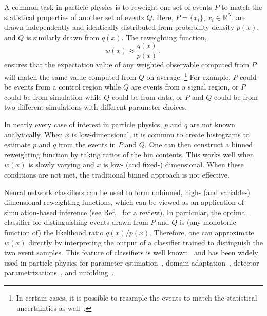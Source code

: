 \documentclass[aps,prx,reprint,preprintnumbers,superscriptaddress,nofootinbib,longbibliography,floatfix]{revtex4-2}
\DeclareRobustCommand{\Ref}[1]{Ref.~\cite{#1}}
\begin{document}
A common task in particle physics is to reweight one set of events $P$ to match the statistical properties of another set of events $Q$.
%
Here, $P=\{x_i\}$, $x_i\in\mathbb{R}^N$, are drawn independently and identically distributed from probability density $p(x)$, and $Q$ is similarly drawn from $q(x)$.
%
The reweighting function,
%
\begin{equation}
    w(x)\approx \frac{q(x)}{p(x)}\,,
\end{equation}
%
ensures that the expectation value of any weighted observable computed from $P$ will match the same value computed from $Q$ on average.%
%
\footnote{In certain cases, it is possible to resample the events to match the statistical uncertainties as well~\cite{Nachman:2020fff}.}
%
For example, $P$ could be events from a control region while $Q$ are events from a signal region, or $P$ could be from simulation while $Q$ could be from data, or $P$ and $Q$ could be from two different simulations with different parameter choices.



In nearly every case of interest in particle physics, $p$ and $q$ are not known analytically. 
%
When $x$ is low-dimensional, it is common to create histograms to estimate $p$ and $q$ from the events in $P$ and $Q$.
%
One can then construct a binned reweighting function by taking ratios of the bin contents.
%
This works well when $w(x)$ is slowly varying and $x$ is low- (and fixed-) dimensional.
%
When these conditions are not met, the traditional binned approach is not effective.


Neural network classifiers can be used to form unbinned, high- (and variable-) dimensional reweighting functions, which can be viewed as an application of simulation-based inference (see \Ref{2019arXiv191101429C} for a review).
%
In particular, the optimal classifier for distinguishing events drawn from $P$ and $Q$ is (any monotonic function of) the likelihood ratio $q(x)/p(x)$.
%
Therefore, one can approximate $w(x)$ directly by interpreting the output of a classifier trained to distinguish the two event samples.
%
This feature of classifiers is well known~\cite{hastie01statisticallearning,sugiyama_suzuki_kanamori_2012} and has been widely used in particle physics for parameter estimation~\cite{Cranmer:2015bka,Brehmer:2018kdj,Brehmer:2018eca,Brehmer:2019xox,Brehmer:2018hga,Stoye:2018ovl,1907.08209,Hollingsworth:2020kjg,2010.03569}, domain adaptation~\cite{Andreassen:2020nkr}, detector parametrizations~\cite{Badiali:2020wal}, and unfolding~\cite{bunse2018unification,Ruhe2019MiningFS,Andreassen:2019cjw,Andreassen:2021zzk}.
\end{document}

